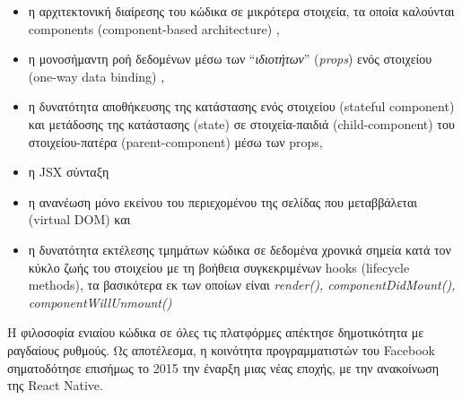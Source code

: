 \begin{itemize}
\item η αρχιτεκτονική διαίρεσης του κώδικα σε μικρότερα στοιχεία, τα οποία καλούνται components (component-based architecture) \cite{[REACT1]},
\item η μονοσήμαντη ροή δεδομένων μέσω των ``\textit{ιδιοτήτων}'' (\textit{props}) ενός στοιχείου (one-way data binding) \cite{[REACT1]},
\item η δυνατότητα αποθήκευσης της κατάστασης ενός στοιχείου (stateful component) και μετάδοσης της κατάστασης (state) σε στοιχεία-παιδιά (child-component) του στοιχείου-πατέρα (parent-component) μέσω των props,
\item η JSX σύνταξη \cite{[REACT3]}
\item η ανανέωση μόνο εκείνου του περιεχομένου της σελίδας που μεταββάλεται (virtual DOM) \cite{[REACT2]} και
\item η δυνατότητα εκτέλεσης τμημάτων κώδικα σε δεδομένα χρονικά σημεία κατά τον κύκλο ζωής του στοιχείου με τη βοήθεια συγκεκριμένων hooks (lifecycle methods), τα βασικότερα εκ των οποίων είναι \textit{render(), componentDidMount(), componentWillUnmount()}
\end{itemize}

H φιλοσοφία ενιαίου κώδικα σε όλες τις πλατφόρμες απέκτησε δημοτικότητα με ραγδαίους ρυθμούς. Ως αποτέλεσμα, η κοινότητα προγραμματιστών του Facebook σηματοδότησε επισήμως το 2015 την έναρξη μιας νέας εποχής, με την ανακοίνωση της React Native. 
 
